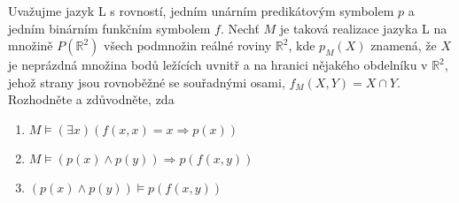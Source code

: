\subsubsection{}
Uvažujme jazyk L s rovností, jedním unárním predikátovým symbolem $p$ a jedním
binárním funkčním symbolem $f$. Nechť $M$ je taková realizace jazyka L na
množině $P(\mathbb{R}^{2})$ všech podmnožin reálné roviny $\mathbb{R}^{2}$, kde
$p_{M}(X)$ znamená, že $X$ je neprázdná množina bodů ležících uvnitř a na
hranici nějakého obdelníku v $\mathbb{R}^{2}$, jehož strany jsou rovnoběžné se
souřadnými osami, $f_{M}(X,Y) = X \cap Y$. Rozhodněte a zdůvodněte, zda
\begin{enumerate}[(1)]
  \item $M \models (\exists x)(f(x,x)=x \Rightarrow p(x))$
  \item $M \models (p(x) \wedge p(y)) \Rightarrow p(f(x,y))$
  \item $(p(x) \wedge p(y)) \models p(f(x,y))$
\end{enumerate}

